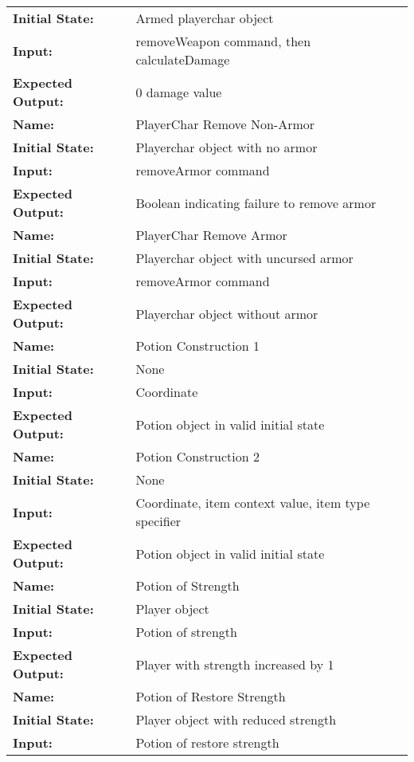 \documentclass[12pt, titlepage]{article}
\begin{document}
\begin{center}
\begin{longtable}{ l | p{10cm} }
				\textbf{Initial State:} & Armed playerchar object\\
				\textbf{Input:} & removeWeapon command, then calculateDamage\\
				\textbf{Expected Output:} & 0 damage value\\[1em]
				\hline
				\rule{0pt}{2em}\textbf{Name:} & PlayerChar Remove Non-Armor\\
				\textbf{Initial State:} & Playerchar object with no armor\\
				\textbf{Input:} & removeArmor command\\
				\textbf{Expected Output:} & Boolean indicating failure to remove armor\\[1em]
				\hline
				\rule{0pt}{2em}\textbf{Name:} & PlayerChar Remove Armor\\
				\textbf{Initial State:} & Playerchar object with uncursed armor\\
				\textbf{Input:} & removeArmor command\\
				\textbf{Expected Output:} & Playerchar object without armor\\[1em]
				\hline
				\rule{0pt}{2em}\textbf{Name:} & Potion Construction 1\\
				\textbf{Initial State:} & None\\
				\textbf{Input:} & Coordinate\\
				\textbf{Expected Output:} & Potion object in valid initial state\\[1em]
				\hline
				\rule{0pt}{2em}\textbf{Name:} & Potion Construction 2\\
				\textbf{Initial State:} & None\\
				\textbf{Input:} & Coordinate, item context value, item type specifier\\
				\textbf{Expected Output:} & Potion object in valid initial state\\[1em]
				\hline
				\rule{0pt}{2em}\textbf{Name:} & Potion of Strength\\
				\textbf{Initial State:} & Player object\\
				\textbf{Input:} & Potion of strength\\
				\textbf{Expected Output:} & Player with strength increased by 1\\[1em]
				\hline
				\rule{0pt}{2em}\textbf{Name:} & Potion of Restore Strength\\
				\textbf{Initial State:} & Player object with reduced strength\\
				\textbf{Input:} & Potion of restore strength\\

\end{longtable}
\end{center}
\end{document}
